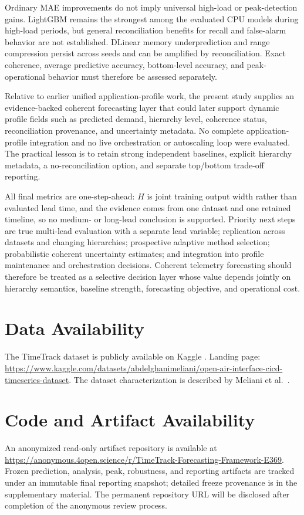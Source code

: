 \documentclass[a4paper,fleqn]{cas-dc}
\begin{document}
Ordinary {MAE} improvements do not imply universal high-load or peak-detection
gains.
LightGBM remains the strongest among the evaluated {CPU} models during
high-load periods, but general reconciliation benefits for recall and
false-alarm behavior are not established.
DLinear memory underprediction and range compression persist across seeds and
can be amplified by reconciliation.
Exact coherence, average predictive accuracy, bottom-level accuracy, and
peak-operational behavior must therefore be assessed separately.

Relative to earlier unified application-profile work, the present study
supplies an evidence-backed coherent forecasting layer that could later support
dynamic profile fields such as predicted demand, hierarchy level, coherence
status, reconciliation provenance, and uncertainty metadata.
No complete application-profile integration and no live orchestration or
autoscaling loop were evaluated.
The practical lesson is to retain strong independent baselines, explicit
hierarchy metadata, a no-reconciliation option, and separate top/bottom
trade-off reporting.

All final metrics are one-step-ahead: $H$ is joint training output width rather
than evaluated lead time, and the evidence comes from one dataset and one
retained timeline, so no medium- or long-lead conclusion is supported.
Priority next steps are true multi-lead evaluation with a separate lead
variable; replication across datasets and changing hierarchies; prospective
adaptive method selection; probabilistic coherent uncertainty estimates; and
integration into profile maintenance and orchestration decisions.
Coherent telemetry forecasting should therefore be treated as a selective
decision layer whose value depends jointly on hierarchy semantics, baseline
strength, forecasting objective, and operational cost.

\section*{Data Availability}
The TimeTrack dataset is publicly available on Kaggle
\cite{meliani2025timetrackkaggle}.
Landing page:
\url{https://www.kaggle.com/datasets/abdelghanimeliani/open-air-interface-cicd-timeseries-dataset}.
The dataset characterization is described by Meliani et al.\
\cite{meliani2025timetrack}.

\section*{Code and Artifact Availability}
An anonymized read-only artifact repository is available at
\url{https://anonymous.4open.science/r/TimeTrack-Forecasting-Framework-E369}.
Frozen prediction, analysis, peak, robustness, and reporting artifacts are
tracked under an immutable final reporting snapshot; detailed freeze provenance
is in the supplementary material.
The permanent repository URL will be disclosed after completion of the anonymous
review process.
\end{document}
